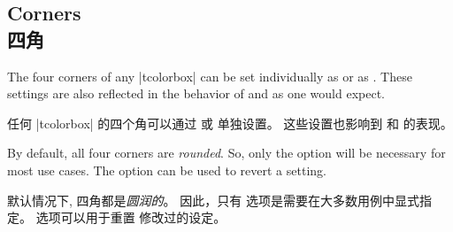 \setcounter{section}{4}
\setcounter{subsection}{7}  
\setcounter{subsubsection}{6} 
\subsection{Corners\\四角}\label{subsec:corners}

The four corners of any |tcolorbox| can be set individually as
 or as .
These settings are also reflected in the behavior of 
and  as one would expect.

任何 |tcolorbox| 的四个角可以通过  或  单独设置。
这些设置也影响到  和  的表现。

By default, all four corners are \emph{rounded}. So, only the
 option will be necessary for most use cases.
The  option can be used to revert a 
setting.

默认情况下, 四角都是\emph{圆润的}。 因此，只有
 选项是需要在大多数用例中显式指定。
 选项可以用于重置 
修改过的设定。


